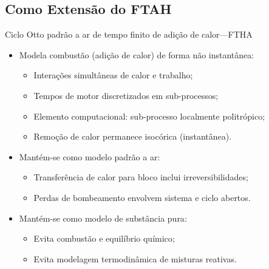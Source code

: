 \subsection{Como Extensão do FTAH}

    \begin{frame}{Ciclo Otto padrão a ar de tempo finito de adição de calor---FTHA}\vspace*{-2em}
        \begin{itemize}
            \item<1->  Modela combustão (adição de calor) de forma \alert{não instantânea}:
            \begin{itemize}
                \item<2->  Interações \alert{simultâneas} de \alert{calor} e \alert{trabalho};
                \item<3->  Tempos de motor \alert{discretizados} em \alert{sub-processos};
                \item<4->  Elemento computacional: sub-processo \alert{localmente politrópico};
                \item<5->  \alert{Remoção} de calor permanece \alert{isocórica} (instantânea).
            \end{itemize}
            \item<6->  Mantém-se como modelo \alert{padrão a ar}:
            \begin{itemize}
                \item<7->  Transferência de calor para bloco inclui \alert{irreversibilidades};
                \item<8->  Perdas de bombeamento envolvem \alert{sistema e ciclo abertos}.
            \end{itemize}
            \item<9->  Mantém-se como modelo de \alert{substância pura}:
            \begin{itemize}
                \item<10-> Evita \alert{combustão e equilíbrio químico};
                \item<11-> Evita modelagem termodinâmica de \alert{misturas reativas}.
            \end{itemize}
        \end{itemize}
    \end{frame}


